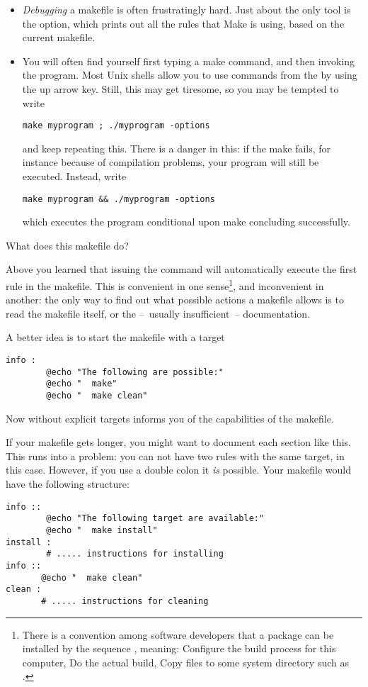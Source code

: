 \begin{itemize}
\item \emph{Debugging} a makefile is often
  frustratingly hard.  Just about the only tool is the  option,
  which prints out all the rules that Make is using, based on the
  current makefile.
\item You will often find yourself first typing a make command, and
  then invoking the program. Most Unix shells allow you to use
  commands from the  by using the
  up arrow key. Still, this may get tiresome, so you may be tempted to
  write
\begin{lstlisting}
make myprogram ; ./myprogram -options
\end{lstlisting}
and keep repeating this.
There is a danger in this: if the make fails, for instance because of
compilation problems, your program will still be executed. Instead, write
\begin{lstlisting}
make myprogram && ./myprogram -options
\end{lstlisting}
which executes the program conditional upon make concluding successfully.
\end{itemize}

 {What does this makefile do?}

Above you learned that issuing the  command will automatically
execute the first rule in the makefile. This is convenient in one
sense\footnote {There is a convention among software developers that a
  package can be installed by the sequence , meaning: Configure the build process for this
  computer, Do the actual build, Copy files to some system directory
  such as .}, and inconvenient in another: the only way to
find out what possible actions a makefile allows is to read the
makefile itself, or the --~usually insufficient~-- documentation.

A better idea is to start the makefile with a target
\begin{lstlisting}
info :
        @echo "The following are possible:"
        @echo "  make"
        @echo "  make clean"
\end{lstlisting}
Now  without explicit targets informs you of the capabilities
of the makefile.

If your makefile gets longer, you might want to document each section
like this. This runs into a problem: you can not have two rules with the same
target,  in this case. However, if you use a double colon
it \emph{is} possible. Your makefile would have the following structure:
\begin{lstlisting}
info ::
        @echo "The following target are available:"
        @echo "  make install"
install :
        # ..... instructions for installing
info ::
       @echo "  make clean"
clean :
       # ..... instructions for cleaning
\end{lstlisting}

